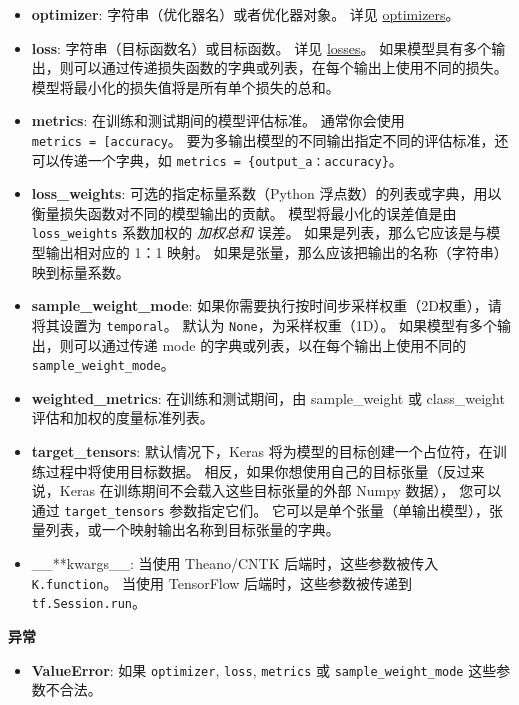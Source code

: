 \begin{itemize}
\tightlist
\item
  \textbf{optimizer}: 字符串（优化器名）或者优化器对象。 详见
  \hyperref[optimizers]{optimizers}。
\item
  \textbf{loss}: 字符串（目标函数名）或目标函数。 详见
  \hyperref[losses]{losses}。
  如果模型具有多个输出，则可以通过传递损失函数的字典或列表，在每个输出上使用不同的损失。
  模型将最小化的损失值将是所有单个损失的总和。
\item
  \textbf{metrics}: 在训练和测试期间的模型评估标准。 通常你会使用
  \texttt{metrics\ =\ {[}\textquotesingle{}accuracy\textquotesingle{}{]}}。
  要为多输出模型的不同输出指定不同的评估标准，还可以传递一个字典，如
  \texttt{metrics\ =\ \{\textquotesingle{}output\_a\textquotesingle{}：\textquotesingle{}accuracy\textquotesingle{}\}}。
\item
  \textbf{loss\_weights}: 可选的指定标量系数（Python
  浮点数）的列表或字典，用以衡量损失函数对不同的模型输出的贡献。
  模型将最小化的误差值是由 \texttt{loss\_weights} 系数加权的
  \emph{加权总和} 误差。 如果是列表，那么它应该是与模型输出相对应的 1：1
  映射。 如果是张量，那么应该把输出的名称（字符串）映到标量系数。
\item
  \textbf{sample\_weight\_mode}:
  如果你需要执行按时间步采样权重（2D权重），请将其设置为
  \texttt{temporal}。 默认为 \texttt{None}，为采样权重（1D）。
  如果模型有多个输出，则可以通过传递 mode
  的字典或列表，以在每个输出上使用不同的 \texttt{sample\_weight\_mode}。
\item
  \textbf{weighted\_metrics}: 在训练和测试期间，由 sample\_weight 或
  class\_weight 评估和加权的度量标准列表。
\item
  \textbf{target\_tensors}: 默认情况下，Keras
  将为模型的目标创建一个占位符，在训练过程中将使用目标数据。
  相反，如果你想使用自己的目标张量（反过来说，Keras
  在训练期间不会载入这些目标张量的外部 Numpy 数据）， 您可以通过
  \texttt{target\_tensors} 参数指定它们。
  它可以是单个张量（单输出模型），张量列表，或一个映射输出名称到目标张量的字典。
\item
  \_\_**kwargs\_\_: 当使用 Theano/CNTK 后端时，这些参数被传入
  \texttt{K.function}。 当使用 TensorFlow 后端时，这些参数被传递到
  \texttt{tf.Session.run}。
\end{itemize}

\textbf{异常}

\begin{itemize}
\tightlist
\item
  \textbf{ValueError}: 如果 \texttt{optimizer}, \texttt{loss},
  \texttt{metrics} 或 \texttt{sample\_weight\_mode} 这些参数不合法。
\end{itemize}



